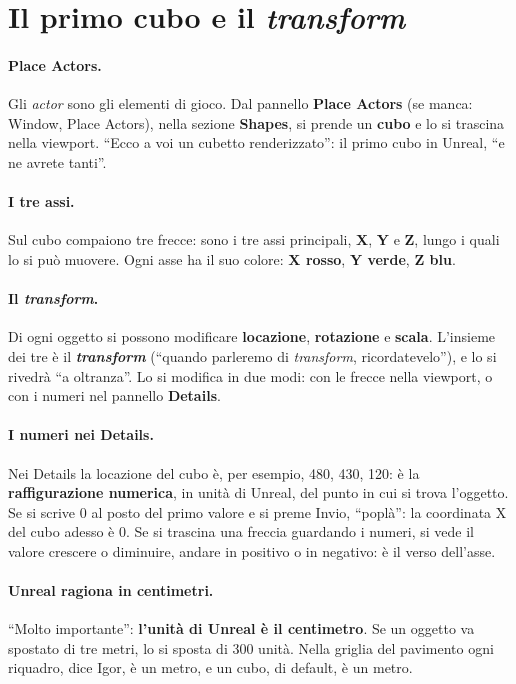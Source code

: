 \section{Il primo cubo e il \emph{transform}}
\label{ue1:sec:transform}

\paragraph{Place Actors.} Gli \emph{actor} sono gli elementi di gioco. Dal pannello
\textbf{Place Actors} (se manca: Window, Place Actors), nella sezione \textbf{Shapes},
si prende un \textbf{cubo} e lo si trascina nella viewport. ``Ecco a voi un cubetto
renderizzato'': il primo cubo in Unreal, ``e ne avrete tanti''.

\paragraph{I tre assi.} Sul cubo compaiono tre frecce: sono i tre assi principali,
\textbf{X}, \textbf{Y} e \textbf{Z}, lungo i quali lo si può muovere. Ogni asse ha il
suo colore: \textbf{X rosso}, \textbf{Y verde}, \textbf{Z blu}.

\paragraph{Il \emph{transform}.} Di ogni oggetto si possono modificare
\textbf{locazione}, \textbf{rotazione} e \textbf{scala}. L'insieme dei tre è il
\textbf{\emph{transform}} (``quando parleremo di \emph{transform}, ricordatevelo''), e
lo si rivedrà ``a oltranza''. Lo si modifica in due modi: con le frecce nella viewport,
o con i numeri nel pannello \textbf{Details}.

\paragraph{I numeri nei Details.} Nei Details la locazione del cubo è, per esempio, 480,
430, 120: è la \textbf{raffigurazione numerica}, in unità di Unreal, del punto in cui si
trova l'oggetto. Se si scrive 0 al posto del primo valore e si preme Invio, ``poplà'':
la coordinata X del cubo adesso è 0. Se si trascina una freccia guardando i numeri, si
vede il valore crescere o diminuire, andare in positivo o in negativo: è il verso
dell'asse.

\paragraph{Unreal ragiona in centimetri.} ``Molto importante'': \textbf{l'unità di Unreal
è il centimetro}. Se un oggetto va spostato di tre metri, lo si sposta di 300 unità.
Nella griglia del pavimento ogni riquadro, dice Igor, è un metro, e un cubo, di
default, è un metro.

